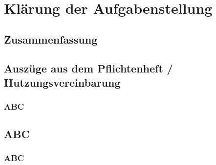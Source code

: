 \section{Klärung der Aufgabenstellung}
\subsection{Zusammenfassung}

\subsection{Auszüge aus dem Pflichtenheft / Hutzungsvereinbarung}

\subsubsection{ABC}
\subsection{ABC}
\subsubsection{ABC}